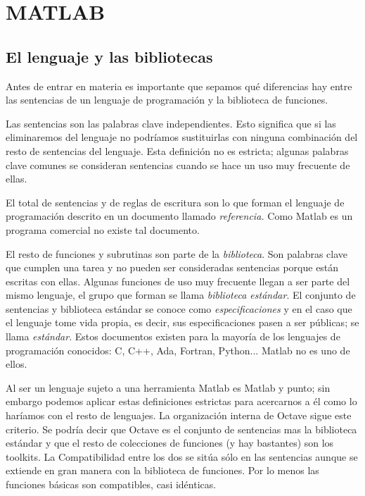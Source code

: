 \chapter{MATLAB}



\section{El lenguaje y las bibliotecas}

Antes de entrar en materia es importante que sepamos qué diferencias
hay entre las sentencias de un lenguaje de programación y la
biblioteca de funciones.

Las sentencias son las palabras clave independientes. Esto significa
que si las eliminaremos del lenguaje no podríamos sustituirlas con
ninguna combinación del resto de sentencias del lenguaje. Esta
definición no es estricta; algunas palabras clave comunes se
consideran sentencias cuando se hace un uso muy frecuente de ellas.

El total de sentencias y de reglas de escritura son lo que forman el
lenguaje de programación descrito en un documento llamado
\emph{referencia.}  Como Matlab es un programa
comercial no existe tal documento.

El resto de funciones y subrutinas son parte de la
\emph{biblioteca}.  Son palabras clave que cumplen
una tarea y no pueden ser consideradas sentencias porque están
escritas con ellas. Algunas funciones de uso muy frecuente llegan a
ser parte del mismo lenguaje, el grupo que forman se llama
\emph{biblioteca estándar}.  El conjunto de
sentencias y biblioteca estándar se conoce como
\emph{especificaciones} y en el caso que el lenguaje tome vida propia,
es decir, sus especificaciones pasen a ser públicas; se llama
\emph{estándar}. Estos documentos existen para la mayoría de los
lenguajes de programación conocidos: C, C++, Ada, Fortran, Python...
Matlab no es uno de ellos.

Al ser un lenguaje sujeto a una herramienta Matlab es Matlab y punto;
sin embargo podemos aplicar estas definiciones estrictas para
acercarnos a él como lo haríamos con el resto de lenguajes. La
organización interna de Octave sigue este criterio. Se podría decir
que Octave es el conjunto de sentencias mas la biblioteca estándar y
que el resto de colecciones de funciones (y hay bastantes) son los
toolkits. La Compatibilidad entre los dos se sitúa sólo en las
sentencias aunque se extiende en gran manera con la biblioteca de
funciones. Por lo menos las funciones básicas son compatibles, casi
idénticas.

